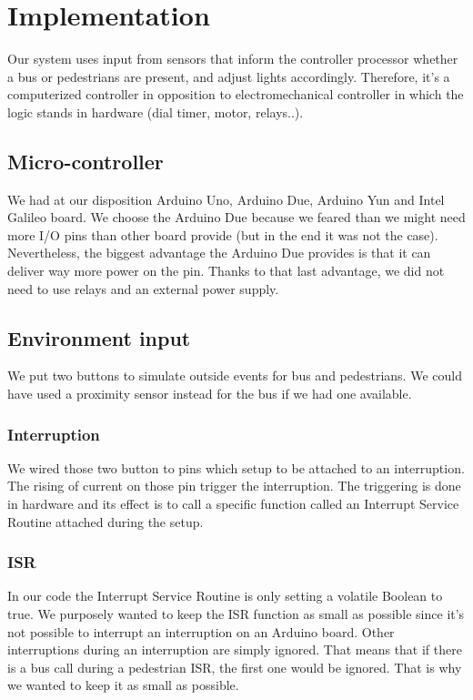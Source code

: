 \section{Implementation}

Our system uses input from sensors that inform the controller processor whether a bus or pedestrians are present, and adjust lights accordingly. Therefore, it's a computerized controller in opposition to electromechanical controller in which the logic stands in hardware (dial timer, motor, relays..).

\subsection{Micro-controller}

We had at our disposition Arduino Uno, Arduino Due, Arduino Yun and Intel Galileo board. We choose the Arduino Due because we feared than we might need more I/O pins than other board provide (but in the end it was not the case). Nevertheless, the biggest advantage the Arduino Due provides is that it can deliver way more power on the pin. Thanks to that last advantage, we did not need to use relays and an external power supply.

\subsection{Environment input}

We put two buttons to simulate outside events for bus and pedestrians. We could have used a proximity sensor instead for the bus if we had one available.

\subsubsection{Interruption}

We wired those two button to pins which setup to be attached to an interruption. The rising of current on those pin trigger the interruption. The triggering is done in hardware and its effect is to call a specific function called an Interrupt Service Routine attached during the setup.

\subsubsection{ISR}

In our code the Interrupt Service Routine is only setting a volatile Boolean to true. We purposely wanted to keep the ISR function as small as possible since it's not possible to interrupt an interruption on an Arduino board. Other interruptions during an interruption are simply ignored. That means that if there is a bus call during a pedestrian ISR, the first one would be ignored. That is why we wanted to keep it as small as possible. 

